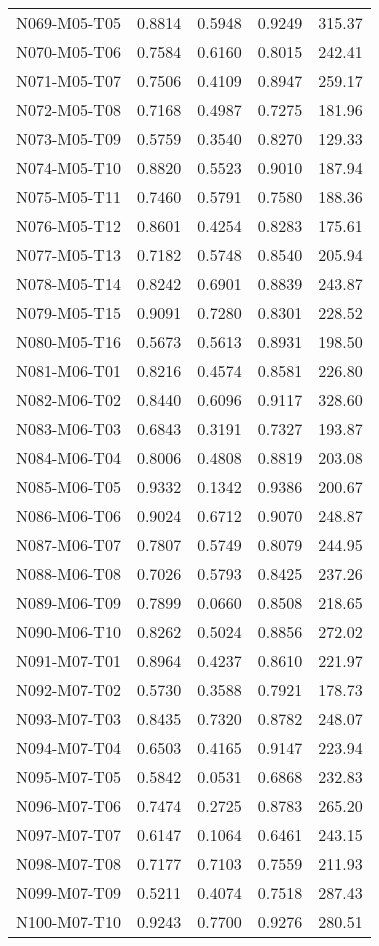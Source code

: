 \begin{longtable}[c]{|p{8cm}|c|l|l|l|}
N069-M05-T05 & 0.8814 & 0.5948 & 0.9249 & 315.37 \\
N070-M05-T06 & 0.7584 & 0.6160 & 0.8015 & 242.41 \\
N071-M05-T07 & 0.7506 & 0.4109 & 0.8947 & 259.17 \\
N072-M05-T08 & 0.7168 & 0.4987 & 0.7275 & 181.96 \\
N073-M05-T09 & 0.5759 & 0.3540 & 0.8270 & 129.33 \\
N074-M05-T10 & 0.8820 & 0.5523 & 0.9010 & 187.94 \\
N075-M05-T11 & 0.7460 & 0.5791 & 0.7580 & 188.36 \\
N076-M05-T12 & 0.8601 & 0.4254 & 0.8283 & 175.61 \\
N077-M05-T13 & 0.7182 & 0.5748 & 0.8540 & 205.94 \\
N078-M05-T14 & 0.8242 & 0.6901 & 0.8839 & 243.87 \\
N079-M05-T15 & 0.9091 & 0.7280 & 0.8301 & 228.52 \\
N080-M05-T16 & 0.5673 & 0.5613 & 0.8931 & 198.50 \\
N081-M06-T01 & 0.8216 & 0.4574 & 0.8581 & 226.80 \\
N082-M06-T02 & 0.8440 & 0.6096 & 0.9117 & 328.60 \\
N083-M06-T03 & 0.6843 & 0.3191 & 0.7327 & 193.87 \\
N084-M06-T04 & 0.8006 & 0.4808 & 0.8819 & 203.08 \\
N085-M06-T05 & 0.9332 & 0.1342 & 0.9386 & 200.67 \\
N086-M06-T06 & 0.9024 & 0.6712 & 0.9070 & 248.87 \\
N087-M06-T07 & 0.7807 & 0.5749 & 0.8079 & 244.95 \\
N088-M06-T08 & 0.7026 & 0.5793 & 0.8425 & 237.26 \\
N089-M06-T09 & 0.7899 & 0.0660 & 0.8508 & 218.65 \\
N090-M06-T10 & 0.8262 & 0.5024 & 0.8856 & 272.02 \\
N091-M07-T01 & 0.8964 & 0.4237 & 0.8610 & 221.97 \\
N092-M07-T02 & 0.5730 & 0.3588 & 0.7921 & 178.73 \\
N093-M07-T03 & 0.8435 & 0.7320 & 0.8782 & 248.07 \\
N094-M07-T04 & 0.6503 & 0.4165 & 0.9147 & 223.94 \\
N095-M07-T05 & 0.5842 & 0.0531 & 0.6868 & 232.83 \\
N096-M07-T06 & 0.7474 & 0.2725 & 0.8783 & 265.20 \\
N097-M07-T07 & 0.6147 & 0.1064 & 0.6461 & 243.15 \\
N098-M07-T08 & 0.7177 & 0.7103 & 0.7559 & 211.93 \\
N099-M07-T09 & 0.5211 & 0.4074 & 0.7518 & 287.43 \\
N100-M07-T10 & 0.9243 & 0.7700 & 0.9276 & 280.51 \\
\hline

\end{longtable}

